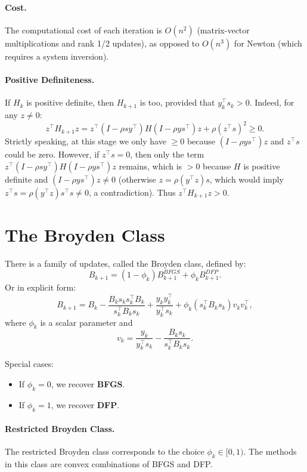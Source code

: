 \paragraph{Cost.} The computational cost of each iteration is $O(n^2)$ (matrix-vector multiplications and rank 1/2 updates), as opposed to $O(n^3)$ for Newton (which requires a system inversion).

\paragraph{Positive Definiteness.}
If $H_k$ is positive definite, then $H_{k+1}$ is too, provided that $y_k^\top s_k > 0$.
Indeed, for any $z \neq 0$:
\[
    z^\top H_{k+1} z = z^\top (I - \rho s y^\top) H (I - \rho y s^\top) z + \rho (z^\top s)^2 \geq 0.
\]
Strictly speaking, at this stage we only have $\geq 0$ because $(I - \rho y s^\top) z$ and $z^\top s$ could be zero. However, if $z^\top s = 0$, then only the term $z^\top (I - \rho s y^\top) H (I - \rho y s^\top) z$ remains, which is $> 0$ because $H$ is positive definite and $(I - \rho y s^\top) z \neq 0$ (otherwise $z = \rho (y^\top z) s$, which would imply $z^\top s = \rho (y^\top z) s^\top s \neq 0$, a contradiction). Thus $z^\top H_{k+1} z > 0$.

\section{The Broyden Class}

There is a family of updates, called the Broyden class, defined by:
\begin{equation}
    B_{k+1} = (1-\phi_k) B_{k+1}^{BFGS} + \phi_k B_{k+1}^{DFP}.
\end{equation}
Or in explicit form:
\begin{equation}
    B_{k+1} = B_k - \frac{B_k s_k s_k^\top B_k}{s_k^\top B_k s_k} + \frac{y_k y_k^\top}{y_k^\top s_k} + \phi_k (s_k^\top B_k s_k) v_k v_k^\top,
\end{equation}
where $\phi_k$ is a scalar parameter and
\[
    v_k = \frac{y_k}{y_k^\top s_k} - \frac{B_k s_k}{s_k^\top B_k s_k}.
\]

Special cases:
\begin{itemize}
    \item If $\phi_k = 0$, we recover \textbf{BFGS}.
    \item If $\phi_k = 1$, we recover \textbf{DFP}.
\end{itemize}

\paragraph{Restricted Broyden Class.}
The restricted Broyden class corresponds to the choice $\phi_k \in [0, 1)$.
The methods in this class are convex combinations of BFGS and DFP.

